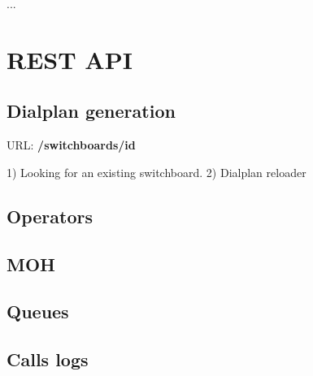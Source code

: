 ...


\section{REST API}

\subsection{Dialplan generation}
URL: \textbf{/switchboards/{id}}

1) Looking for an existing switchboard.
2) Dialplan reloader


\subsection{Operators}

\subsection{MOH}

\subsection{Queues}

\subsection{Calls logs}




